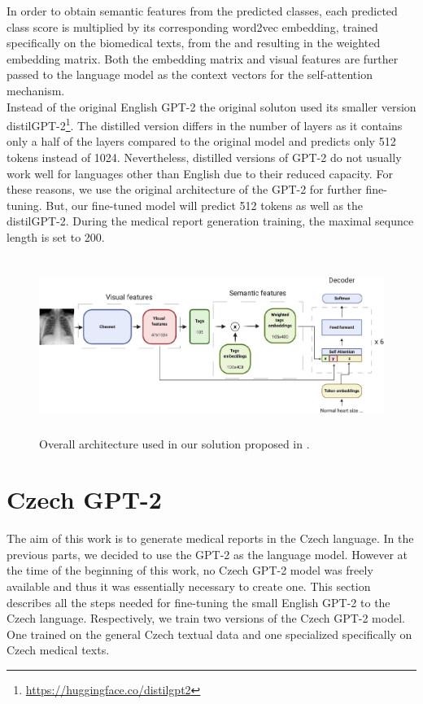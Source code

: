 In order to obtain semantic features from the predicted classes, each predicted class score is multiplied by its corresponding word2vec\citep{mikolov2013distributed} embedding, trained specifically on the biomedical texts, from the \citet{mcdonald2018deep} and resulting in the weighted embedding matrix. Both the embedding matrix and visual features are further passed to the language model as the context vectors for the self-attention mechanism.\\

Instead of the original English GPT-2 the original soluton used its smaller version distilGPT-2\footnote[2]{\url{https://huggingface.co/distilgpt2}}. The distilled version differs in the number of layers as it contains only a half of the layers compared to the original model and predicts only 512 tokens instead of 1024. Nevertheless, distilled versions of GPT-2 do not usually work well for languages other than English due to their reduced capacity. For these reasons, we use the original architecture of the GPT-2 for further fine-tuning. But, our fine-tuned model will predict 512 tokens as well as the distilGPT-2. During the medical report generation training, the maximal sequnce length is set to 200.\\
 
\begin{figure}[h]\centering
\includegraphics[width=145mm, height=57mm]{../img/OmarArchitecture}
\caption{Overall architecture used in our solution proposed in \citet{alfarghaly2021automated}.}
\label{fig01:OmarArchitecutre}
\end{figure}

\section{Czech GPT-2}
The aim of this work is to generate medical reports in the Czech language. In the previous parts, we decided to use the GPT-2 as the language model. However at the time of the beginning of this work, no Czech GPT-2 model was freely available and thus it was essentially necessary to create one. This section describes all the steps needed for fine-tuning the small English GPT-2 to the Czech language. Respectively, we train two versions of the Czech GPT-2 model. One trained on the general Czech textual data and one specialized specifically on Czech medical texts.

